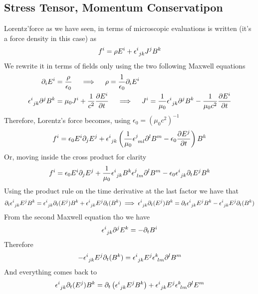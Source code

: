 \documentclass[../electromagnetism]{subfiles}
\begin{document}
\subsection{Stress Tensor, Momentum Conservatipon}
Lorentz'force as we have seen, in terms of microscopic evaluations is written (it's a force density in this case) as
\begin{equation}
	f^i=\rho E^i+\epsilon^{i}_{\ jk}J^jB^k
	\label{eq:lorentzforcedensity}
\end{equation}
We rewrite it in terms of fields only using the two following Maxwell equations
\begin{equation}
	\begin{aligned}
		\partial_iE^i&=\frac{\rho}{\epsilon_0}\quad\implies\quad\rho=\frac{1}{\epsilon_0}\partial_iE^i\\
		\epsilon^{i}_{\ jk}\partial^jB^k&=\mu_0J^i+\frac{1}{c^2}\pdv{E^i}{t}\quad\implies\quad J^i=\frac{1}{\mu_0}\epsilon^{i}_{\ jk}\partial^jB^k-\frac{1}{\mu_0c^2}\pdv{E^i}{t}
	\end{aligned}
	\label{eq:currentandchargeasfields}
\end{equation}
Therefore, Lorentz's force becomes, using $\epsilon_0=(\mu_0c^2)^{-1}$
\begin{equation*}
	f^i=\epsilon_0E^i\partial_jE^j+\epsilon^{i}_{\ jk}\left( \frac{1}{\mu_0}\epsilon^{j}_{\ ml}\partial^lB^m-\epsilon_0\pdv{E^j}{t} \right)B^k
\end{equation*}
Or, moving inside the cross product for clarity
\begin{equation*}
	f^i=\epsilon_0E^i\partial_jE^j+\frac{1}{\mu_0}\epsilon^{i}_{\ jk}B^k\epsilon^{j}_{\ lm}\partial^lB^m-\epsilon_0\epsilon^{i}_{\ jk}\partial_t{E^j}B^k
\end{equation*}
Using the product rule on the time derivative at the last factor we have that
\begin{equation*}
	\partial_t\epsilon^{i}_{\ jk}E^jB^k=\epsilon^{i}_{\ jk}\partial_t(E^j)B^k+\epsilon^{i}_{\ jk}E^j\partial_t(B^k)\implies\epsilon^{i}_{\ jk}\partial_t(E^j)B^k=\partial_t\epsilon^{i}_{\ jk}E^jB^k-\epsilon^{i}_{\ jk}E^j\partial_t(B^k)
\end{equation*}
From the second Maxwell equation tho we have
\begin{equation*}
	\epsilon^{i}_{\ jk}\partial^jE^k=-\partial_tB^i
\end{equation*}
Therefore
\begin{equation*}
	-\epsilon^{i}_{\ jk}E^j\partial_t(B^k)=\epsilon^{i}_{\ jk}E^j\epsilon^{k}_{\ lm}\partial^lB^m
\end{equation*}
And everything comes back to
\begin{equation*}
	\epsilon^{i}_{\ jk}\partial_t(E^j)B^k=\partial_t\left( \epsilon^{i}_{\ jk}E^jB^k \right)+\epsilon^{i}_{\ jk}E^j\epsilon^{k}_{\ lm}\partial^lE^m
\end{equation*}
\end{document}
